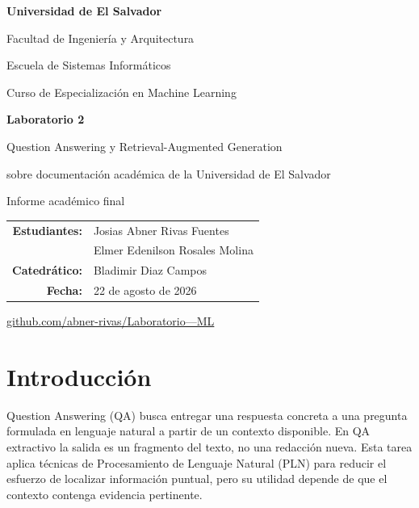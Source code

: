 \documentclass[12pt,letterpaper]{article}
\begin{document}
\hypersetup{pageanchor=false}
\begin{titlepage}
  \centering
  {\Large\bfseries Universidad de El Salvador\par}
  \vspace{0.3cm}
  {\large Facultad de Ingeniería y Arquitectura\par}
  {\large Escuela de Sistemas Informáticos\par}
  \vspace{0.9cm}
  {\large Curso de Especialización en Machine Learning\par}
  \vfill
  {\Huge\bfseries Laboratorio 2\par}
  \vspace{0.5cm}
  {\LARGE Question Answering y Retrieval-Augmented Generation\par}
  \vspace{0.25cm}
  {\Large sobre documentación académica de la Universidad de El Salvador\par}
  \vspace{1.2cm}
  {\large Informe académico final\par}
  \vfill
  \begin{tabular}{rl}
    \textbf{Estudiantes:} & Josias Abner Rivas Fuentes\\
                          & Elmer Edenilson Rosales Molina\\[0.3cm]
    \textbf{Catedrático:} & Bladimir Diaz Campos\\
    \textbf{Fecha:}       & 22 de agosto de 2026\\
  \end{tabular}
  \vfill
  \href{https://github.com/abner-rivas/Laboratorio---ML.git}
       {github.com/abner-rivas/Laboratorio---ML}
\end{titlepage}

\hypersetup{pageanchor=true}
\begingroup
\small
\setcounter{tocdepth}{2}
\tableofcontents
\endgroup
\clearpage

\setcounter{section}{1}

\section{Introducción}

Question Answering (QA) busca entregar una respuesta concreta a una pregunta
formulada en lenguaje natural a partir de un contexto disponible. En QA
extractivo la salida es un fragmento del texto, no una redacción nueva. Esta
tarea aplica técnicas de Procesamiento de Lenguaje Natural (PLN) para reducir
el esfuerzo de localizar información puntual, pero su utilidad depende de que
el contexto contenga evidencia pertinente.
\end{document}
